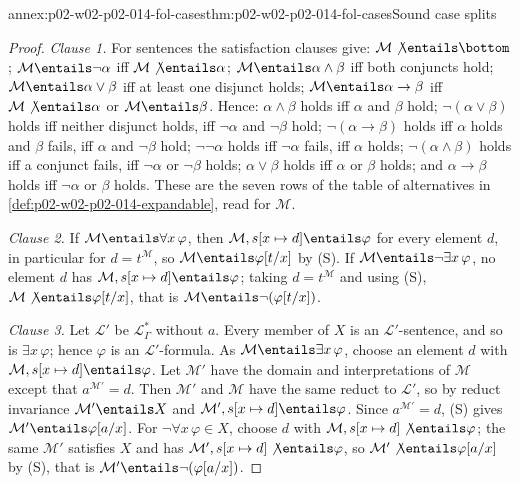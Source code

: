 \begin{annexitem}{annex:p02-w02-p02-014-fol-cases}{thm:p02-w02-p02-014-fol-cases}{Sound case splits}
\begin{proof}
\emph{Clause 1.}  For sentences the satisfaction clauses give:
\(\mathcal M\not\entails\bottom\); \(\mathcal M\entails\neg\alpha\) iff
\(\mathcal M\not\entails\alpha\); \(\mathcal M\entails\alpha\land\beta\) iff
both conjuncts hold; \(\mathcal M\entails\alpha\lor\beta\) iff at least one
disjunct holds; \(\mathcal M\entails\alpha\to\beta\) iff
\(\mathcal M\not\entails\alpha\) or \(\mathcal M\entails\beta\).  Hence:
\(\alpha\land\beta\) holds iff \(\alpha\) and \(\beta\) hold;
\(\neg(\alpha\lor\beta)\) holds iff neither disjunct holds, iff
\(\neg\alpha\) and \(\neg\beta\) hold; \(\neg(\alpha\to\beta)\) holds iff
\(\alpha\) holds and \(\beta\) fails, iff \(\alpha\) and \(\neg\beta\) hold;
\(\neg\neg\alpha\) holds iff \(\neg\alpha\) fails, iff \(\alpha\) holds;
\(\neg(\alpha\land\beta)\) holds iff a conjunct fails, iff \(\neg\alpha\) or
\(\neg\beta\) holds; \(\alpha\lor\beta\) holds iff \(\alpha\) or \(\beta\)
holds; and \(\alpha\to\beta\) holds iff \(\neg\alpha\) or \(\beta\) holds.
These are the seven rows of the table of alternatives in
\cref{def:p02-w02-p02-014-expandable}, read for \(\mathcal M\).

\emph{Clause 2.}  If \(\mathcal M\entails\forall x\,\varphi\), then
\(\mathcal M,s[x\mapsto d]\entails\varphi\) for every element \(d\), in
particular for \(d=t^{\mathcal M}\), so \(\mathcal M\entails\varphi[t/x]\) by
(S).  If \(\mathcal M\entails\neg\exists x\,\varphi\), no element \(d\) has
\(\mathcal M,s[x\mapsto d]\entails\varphi\); taking \(d=t^{\mathcal M}\) and
using (S), \(\mathcal M\not\entails\varphi[t/x]\), that is
\(\mathcal M\entails\neg(\varphi[t/x])\).

\emph{Clause 3.}  Let \(\mathcal L'\) be \(\mathcal L_{\Gamma}^{*}\) without
\(a\).  Every member of \(X\) is an \(\mathcal L'\)-sentence, and so is
\(\exists x\,\varphi\); hence \(\varphi\) is an \(\mathcal L'\)-formula.  As
\(\mathcal M\entails\exists x\,\varphi\), choose an element \(d\) with
\(\mathcal M,s[x\mapsto d]\entails\varphi\).  Let \(\mathcal M'\) have the
domain and interpretations of \(\mathcal M\) except that
\(a^{\mathcal M'}=d\).  Then \(\mathcal M'\) and \(\mathcal M\) have the same
reduct to \(\mathcal L'\), so by reduct invariance \(\mathcal M'\entails X\)
and \(\mathcal M',s[x\mapsto d]\entails\varphi\).  Since
\(a^{\mathcal M'}=d\), (S) gives \(\mathcal M'\entails\varphi[a/x]\).  For
\(\neg\forall x\,\varphi\in X\), choose \(d\) with
\(\mathcal M,s[x\mapsto d]\not\entails\varphi\); the same \(\mathcal M'\)
satisfies \(X\) and has \(\mathcal M',s[x\mapsto d]\not\entails\varphi\), so
\(\mathcal M'\not\entails\varphi[a/x]\) by (S), that is
\(\mathcal M'\entails\neg(\varphi[a/x])\).


\end{proof}
\end{annexitem}
